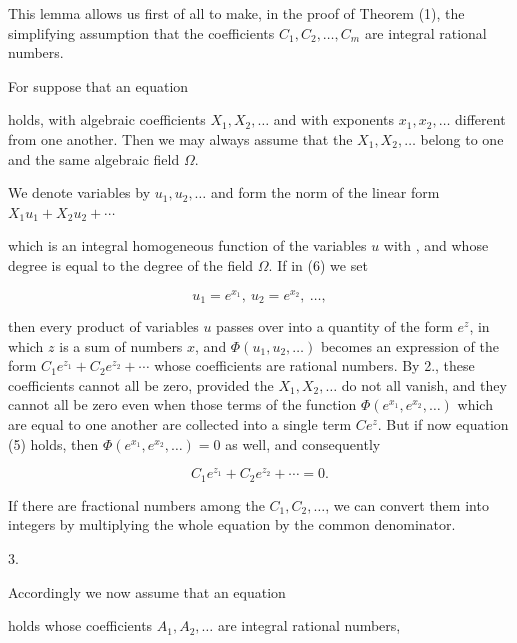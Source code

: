 This lemma allows us first of all to make, in the proof of Theorem (1), the simplifying assumption that the coefficients $C_1, C_2, \ldots, C_m$ are integral rational numbers.

For suppose that an equation


holds, with algebraic coefficients $X_1, X_2, \ldots$ and with exponents $x_1, x_2, \ldots$ different from one another. Then we may always assume that the $X_1, X_2, \ldots$ belong to one and the same algebraic field $\Omega$.

We denote variables by $u_1, u_2, \ldots$ and form the norm of the linear form $X_1u_1+X_2u_2+\cdots$


which is an integral homogeneous function of the variables $u$ with , and whose degree is equal to the degree of the field $\Omega$. If in (6) we set

\[
u_1 = e^{x_1},\ u_2 = e^{x_2},\ \ldots,
\]

then every product of variables $u$ passes over into a quantity of the form $e^z$, in which $z$ is a sum of numbers $x$, and $\Phi(u_1,u_2,\ldots)$ becomes an expression of the form $C_1e^{z_1}+C_2e^{z_2}+\cdots$ whose coefficients are rational numbers. By 2., these coefficients cannot all be zero, provided the $X_1, X_2, \ldots$ do not all vanish, and they cannot all be zero even when those terms of the function $\Phi(e^{x_1},e^{x_2},\ldots)$ which are equal to one another are collected into a single term $Ce^z$. But if now equation (5) holds, then $\Phi(e^{x_1},e^{x_2},\ldots)=0$ as well, and consequently

\[
C_1e^{z_1}+C_2e^{z_2}+\cdots = 0.
\]

If there are fractional numbers among the $C_1, C_2, \ldots$, we can convert them into integers by multiplying the whole equation by the common denominator.

3. 

Accordingly we now assume that an equation


holds whose coefficients $A_1, A_2, \ldots$ are integral rational numbers,
